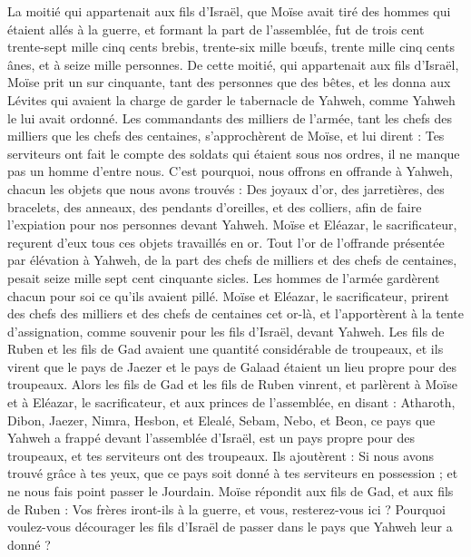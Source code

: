 \begin{multicols}{2}
La moitié qui appartenait aux fils d'Israël, que Moïse avait tiré des hommes qui étaient allés à la guerre,
et formant la part de l'assemblée, fut de trois cent trente-sept mille cinq cents brebis,
trente-six mille bœufs,
trente mille cinq cents ânes,
et à seize mille personnes.
De cette moitié, qui appartenait aux fils d'Israël, Moïse prit un sur cinquante, tant des personnes que des bêtes, et les donna aux Lévites qui avaient la charge de garder le tabernacle de Yahweh, comme Yahweh le lui avait ordonné.
Les commandants des milliers de l'armée, tant les chefs des milliers que les chefs des centaines, s'approchèrent de Moïse,
et lui dirent : Tes serviteurs ont fait le compte des soldats qui étaient sous nos ordres, il ne manque pas un homme d’entre nous.
C'est pourquoi, nous offrons en offrande à Yahweh, chacun les objets que nous avons trouvés : Des joyaux d'or, des jarretières, des bracelets, des anneaux, des pendants d'oreilles, et des colliers, afin de faire l’expiation pour nos personnes devant Yahweh.
Moïse et Eléazar, le sacrificateur, reçurent d'eux tous ces objets travaillés en or.
Tout l'or de l'offrande présentée par élévation à Yahweh, de la part des chefs de milliers et des chefs de centaines, pesait seize mille sept cent cinquante sicles.
Les hommes de l’armée gardèrent chacun pour soi ce qu'ils avaient pillé.
Moïse et Eléazar, le sacrificateur, prirent des chefs des milliers et des chefs de centaines cet or-là, et l'apportèrent à la tente d'assignation, comme souvenir pour les fils d'Israël, devant Yahweh.
\VerseOne{}Les fils de Ruben et les fils de Gad avaient une quantité considérable de troupeaux, et ils virent que le pays de Jaezer et le pays de Galaad étaient un lieu propre pour des troupeaux.
Alors les fils de Gad et les fils de Ruben vinrent, et parlèrent à Moïse et à Eléazar, le sacrificateur, et aux princes de l'assemblée, en disant :
Atharoth, Dibon, Jaezer, Nimra, Hesbon, et Elealé, Sebam, Nebo, et Beon,
ce pays que Yahweh a frappé devant l'assemblée d'Israël, est un pays propre pour des troupeaux, et tes serviteurs ont des troupeaux.
Ils ajoutèrent : Si nous avons trouvé grâce à tes yeux, que ce pays soit donné à tes serviteurs en possession ; et ne nous fais point passer le Jourdain.
Moïse répondit aux fils de Gad, et aux fils de Ruben : Vos frères iront-ils à la guerre, et vous, resterez-vous ici ?
Pourquoi voulez-vous décourager les fils d'Israël de passer dans le pays que Yahweh leur a donné ?

\end{multicols}
